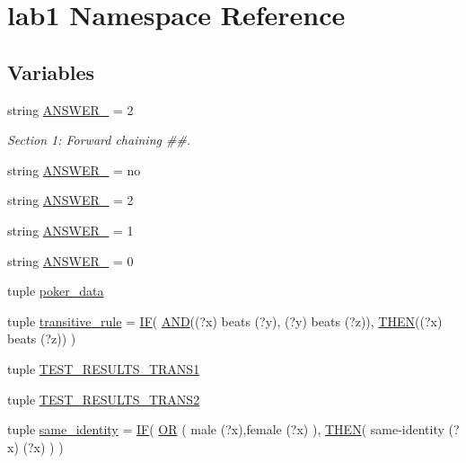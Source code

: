 \hypertarget{namespacelab1}{}\section{lab1 Namespace Reference}
\label{namespacelab1}
\subsection*{Variables}
\begin{DoxyCompactItemize}
\item 
string \hyperlink{namespacelab1_a3549387a1205d37c768ff759e086ae66}{A\+N\+S\+W\+E\+R\+\_} = \textquotesingle{}2\textquotesingle{}
\begin{DoxyCompactList}\small\item\em Section 1\+: Forward chaining \#\#. \end{DoxyCompactList}\item 
string \hyperlink{namespacelab1_a3dc93374ca1c31e7a4c2b752c2cb1bc1}{A\+N\+S\+W\+E\+R\+\_} = \textquotesingle{}no\textquotesingle{}
\item 
string \hyperlink{namespacelab1_a77cf065095bb55ab82c7538c8e103e58}{A\+N\+S\+W\+E\+R\+\_} = \textquotesingle{}2\textquotesingle{}
\item 
string \hyperlink{namespacelab1_a6d90b8d721a1d23c18f38aefc8e096e7}{A\+N\+S\+W\+E\+R\+\_} = \textquotesingle{}1\textquotesingle{}
\item 
string \hyperlink{namespacelab1_a1ebc9d156952ebc97f4ae2c4a3da9f93}{A\+N\+S\+W\+E\+R\+\_} = \textquotesingle{}0\textquotesingle{}
\item 
tuple \hyperlink{namespacelab1_ad37cc74f3655cd6ec628ac88c1e7853d}{poker\+\_\+data}
\item 
tuple \hyperlink{namespacelab1_a29f6dd5bbb2091f0647b3da4e0ac0a04}{transitive\+\_\+rule} = \hyperlink{classproduction_1_1_i_f}{I\+F}( \hyperlink{classproduction_1_1_a_n_d}{A\+N\+D}(\textquotesingle{}(?x) beats (?y)\textquotesingle{}, \textquotesingle{}(?y) beats (?z)\textquotesingle{}), \hyperlink{classproduction_1_1_t_h_e_n}{T\+H\+E\+N}(\textquotesingle{}(?x) beats (?z)\textquotesingle{}) )
\item 
tuple \hyperlink{namespacelab1_a03f037dc8135fd5ee9d98bf9e786edbc}{T\+E\+S\+T\+\_\+\+R\+E\+S\+U\+L\+T\+S\+\_\+\+T\+R\+A\+N\+S1}
\item 
tuple \hyperlink{namespacelab1_a9eba4ad17bd9f310be03c78208c8d7da}{T\+E\+S\+T\+\_\+\+R\+E\+S\+U\+L\+T\+S\+\_\+\+T\+R\+A\+N\+S2}
\item 
tuple \hyperlink{namespacelab1_a898e66c595856ca61d7a684347e1587d}{same\+\_\+identity} = \hyperlink{classproduction_1_1_i_f}{I\+F}( \hyperlink{classproduction_1_1_o_r}{O\+R} ( \textquotesingle{}male (?x)\textquotesingle{},\textquotesingle{}female (?x)\textquotesingle{} ), \hyperlink{classproduction_1_1_t_h_e_n}{T\+H\+E\+N}( \textquotesingle{}same-\/identity (?x) (?x)\textquotesingle{} ) )

\end{DoxyCompactItemize}
